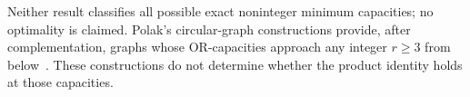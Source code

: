 Neither result classifies all possible exact noninteger minimum
capacities; no optimality is claimed.
Polak's circular-graph constructions provide, after complementation,
graphs whose OR-capacities approach any integer $r\ge3$ from
below~\cite[Chap.~9, Thms.~9.3.1 and~9.3.3]{PolakThesis}.
These constructions do not determine whether the product identity holds
at those capacities.
